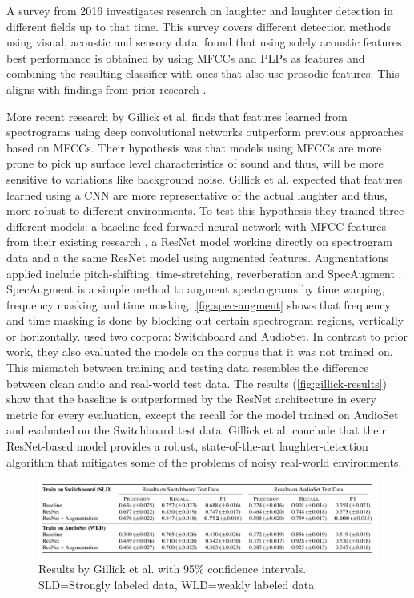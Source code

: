 \documentclass[bsc,frontabs,parskip,deptreport]{infthesis}
\begin{document}
A survey from 2016 \citep{cosentino2016quantitative} investigates research on laughter and laughter detection in different fields up to that time.
This survey covers different detection methods using visual, acoustic and sensory data.
\citeauthor{cosentino2016quantitative} found that using solely acoustic features best performance is obtained by using MFCCs and PLPs as features and combining the resulting classifier with ones that also use prosodic features.
This aligns with findings from prior research \citep{truong2007automatic, knox2006automatic}.

More recent research by Gillick et al. \citep{gillick2021robust} finds that features learned from spectrograms using deep convolutional networks outperform previous approaches based on MFCCs.
Their hypothesis was that models using MFCCs are more prone to pick up surface level characteristics of sound and thus, will be more sensitive to variations like background noise.
Gillick et al. expected that features learned using a CNN are more representative of the actual laughter and thus, more robust to different environments. 
To test this hypothesis they trained three different models: a baseline feed-forward neural network with MFCC features from their existing research \citep{ryokai2018capturing}, a ResNet model working directly on spectrogram data and a the same ResNet model using augmented features. Augmentations applied include pitch-shifting, time-stretching, reverberation and SpecAugment \citep{park2019specaugment}. SpecAugment is a simple method to augment spectrograms by time warping, frequency masking and time masking. \autoref{fig:spec-augment} shows that frequency and time masking is done by blocking out certain spectrogram regions, vertically or horizontally. 
\citeauthor{gillick2021robust} used two corpora: Switchboard \citep{switchboard-corpus} and AudioSet.
In contrast to prior work, they also evaluated the models on the corpus that it was not trained on.
This mismatch between training and testing data resembles the difference between clean audio and real-world test data.
The results (\autoref{fig:gillick-results}) show that the baseline is outperformed by the ResNet architecture in every metric for every evaluation, except the recall for the model trained on AudioSet and evaluated on the Switchboard test data. 
Gillick et al. conclude that their ResNet-based model provides a robust, state-of-the-art laughter-detection algorithm that mitigates some of the problems of noisy real-world environments.

\begin{figure}
    \centering
    \includegraphics[width=14cm]{imgs/results/gillick_et_al.png}
    \caption{Results by Gillick et al. with 95\% confidence intervals. SLD=Strongly labeled data, WLD=weakly labeled data}
    \label{fig:gillick-results}
\end{figure}
\end{document}
